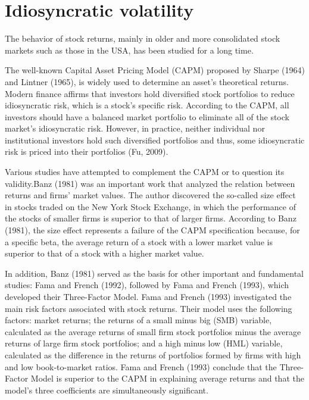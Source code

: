 \section*{Idiosyncratic volatility}

The behavior of stock returns, mainly in older and more consolidated stock markets such as those in the USA, has been studied for a long time.

The well-known Capital Asset Pricing Model (CAPM) proposed by Sharpe (1964) and Lintner (1965), is widely used to determine an asset's theoretical returns. Modern finance affirms that investors hold diversified stock portfolios to reduce idiosyncratic risk, which is a stock's specific risk. According to the CAPM, all investors should have a balanced market portfolio to eliminate all of the stock market's idiosyncratic risk. However, in practice, neither individual nor institutional investors hold such diversified portfolios and thus, some idiosyncratic risk is priced into their portfolios (Fu, 2009).

Various studies have attempted to complement the CAPM or to question its validity.Banz (1981) was an important work that analyzed the relation between returns and firms' market values. The author discovered the so-called size effect in stocks traded on the New York Stock Exchange, in which the performance of the stocks of smaller firms is superior to that of larger firms. According to Banz (1981), the size effect represents a failure of the CAPM specification because, for a specific beta, the average return of a stock with a lower market value is superior to that of a stock with a higher market value.

In addition, Banz (1981) served as the basis for other important and fundamental studies: Fama and French (1992), followed by Fama and French (1993), which developed their Three-Factor Model. Fama and French (1993) investigated the main risk factors associated with stock returns. Their model uses the following factors: market returns; the returns of a small minus big (SMB) variable, calculated as the average returns of small firm stock portfolios minus the average returns of large firm stock portfolios; and a high minus low (HML) variable, calculated as the difference in the returns of portfolios formed by firms with high and low book-to-market ratios. Fama and French (1993) conclude that the Three-Factor Model is superior to the CAPM in explaining average returns and that the model's three coefficients are simultaneously significant.

